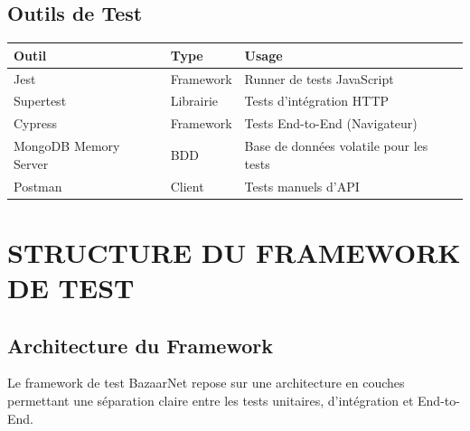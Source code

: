 \documentclass[12pt,a4paper]{article}
\begin{document}
\subsection{Outils de Test}
\begin{tabularx}{\textwidth}{|l|l|X|}
    \hline
    \textbf{Outil} & \textbf{Type} & \textbf{Usage} \\ \hline
    Jest & Framework & Runner de tests JavaScript \\ \hline
    Supertest & Librairie & Tests d'intégration HTTP \\ \hline
    Cypress & Framework & Tests End-to-End (Navigateur) \\ \hline
    MongoDB Memory Server & BDD & Base de données volatile pour les tests \\ \hline
    Postman & Client & Tests manuels d'API \\ \hline
\end{tabularx}

\section{STRUCTURE DU FRAMEWORK DE TEST}

\subsection{Architecture du Framework}
Le framework de test BazaarNet repose sur une architecture en couches permettant une séparation claire entre les tests unitaires, d'intégration et End-to-End.
\end{document}
